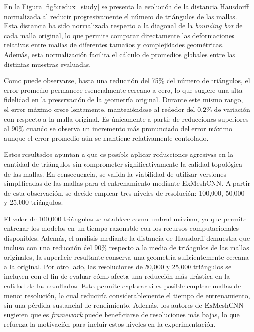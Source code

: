 En la Figura \ref{fig5:redux_study} se presenta la evolución de la distancia Hausdorff normalizada al reducir progresivamente el número de triángulos de las mallas. Esta distancia ha sido normalizada respecto a la diagonal de la \textit{bounding box} de cada malla original, lo que permite comparar directamente las deformaciones relativas entre mallas de diferentes tamaños y complejidades geométricas. Además, esta normalización facilita el cálculo de promedios globales entre las distintas muestras evaluadas.

Como puede observarse, hasta una reducción del 75\% del número de triángulos, el error promedio permanece esencialmente cercano a cero, lo que sugiere una alta fidelidad en la preservación de la geometría original. Durante este mismo rango, el error máximo crece lentamente, manteniéndose al rededor del 0.2\% de variación con respecto a la malla original. Es únicamente a partir de reducciones superiores al 90\% cuando se observa un incremento más pronunciado del error máximo, aunque el error promedio aún se mantiene relativamente controlado.

Estos resultados apuntan a que es posible aplicar reducciones agresivas en la cantidad de triángulos sin comprometer significativamente la calidad topológica de las mallas. En consecuencia, se valida la viabilidad de utilizar versiones simplificadas de las mallas para el entrenamiento mediante ExMeshCNN. A partir de esta observación, se decide emplear tres niveles de resolución: 100,000, 50,000 y 25,000 triángulos.

El valor de 100,000 triángulos se establece como umbral máximo, ya que permite entrenar los modelos en un tiempo razonable con los recursos computacionales disponibles. Además, el análisis mediante la distancia de Hausdorff demuestra que incluso con una reducción del 90\% respecto a la media de triángulos de las mallas originales, la superficie resultante conserva una geometría suficientemente cercana a la original. Por otro lado, las resoluciones de 50,000 y 25,000 triángulos se incluyen con el fin de evaluar cómo afecta una reducción más drástica en la calidad de los resultados. Esto permite explorar si es posible emplear mallas de menor resolución, lo cual reduciría considerablemente el tiempo de entrenamiento, sin una pérdida sustancial de rendimiento. Además, los autores de ExMeshCNN sugieren que es \textit{framework} puede beneficiarse de resoluciones más bajas, lo que refuerza la motivación para incluir estos niveles en la experimentación.

